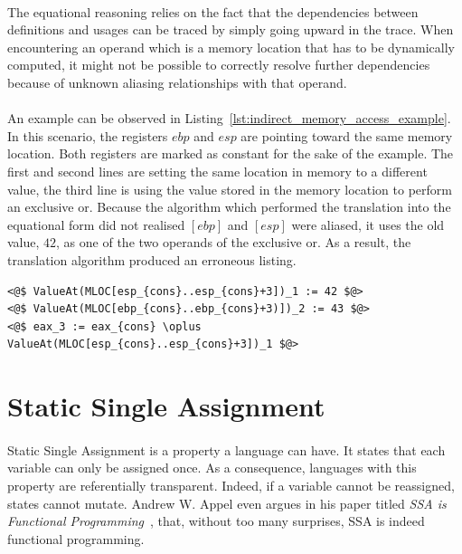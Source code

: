 \paragraph{}
The equational reasoning relies on the fact that the dependencies between definitions and usages can be traced by simply going upward in the trace. When encountering an operand which is a memory location that has to be dynamically computed, it might not be possible to correctly resolve further dependencies because of unknown aliasing relationships with that operand.

\paragraph{}
An example can be observed in Listing~\ref{lst:indirect_memory_access_example}. In this scenario, the registers $ebp$ and $esp$ are pointing toward the same memory location. Both registers are marked as constant for the sake of the example. The first and second lines are setting the same location in memory to a different value, the third line is using the value stored in the memory location to perform an exclusive or. Because the algorithm which performed the translation into the equational form did not realised $[ebp]$ and $[esp]$ were aliased, it uses the old value, $42$, as one of the two operands of the exclusive or. As a result, the translation algorithm produced an erroneous listing. \\

\begin{lstlisting}[caption={Example of a problematic situation that arose from indirect memory accesses.}, label={lst:indirect_memory_access_example}, frame=tlrb, language={[x86masm]Assembler}]
<@$ ValueAt(MLOC[esp_{cons}..esp_{cons}+3])_1 := 42 $@>
<@$ ValueAt(MLOC[ebp_{cons}..ebp_{cons}+3)])_2 := 43 $@>
<@$ eax_3 := eax_{cons} \oplus ValueAt(MLOC[esp_{cons}..esp_{cons}+3])_1 $@>
\end{lstlisting}

\section{Static Single Assignment}
\paragraph{}
Static Single Assignment is a property a language can have. It states that each variable can only be assigned once. As a consequence, languages with this property are referentially transparent. Indeed, if a variable cannot be reassigned, states cannot mutate. Andrew W. Appel even argues in his paper titled \textit{SSA is Functional Programming}~\cite{appel1998ssa}, that, without too many surprises, SSA is indeed functional programming. 

